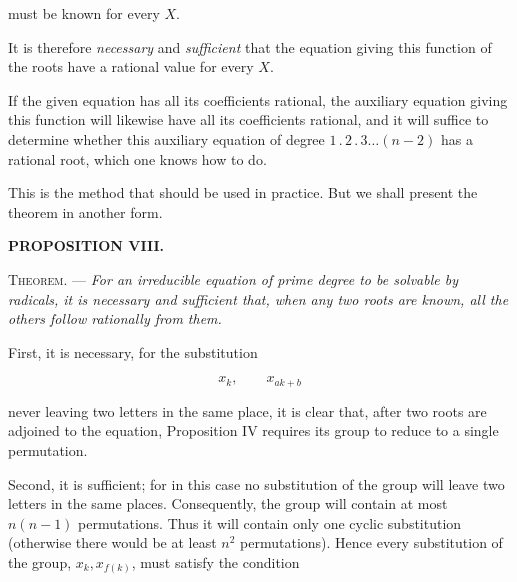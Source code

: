 must be known for every $X$.


It is therefore \emph{necessary} and \emph{sufficient} that the equation giving this
function of the roots have a rational value for every $X$.

If the given equation has all its coefficients rational, the auxiliary equation
giving this function will likewise have all its coefficients rational, and it
will suffice to determine whether this auxiliary equation of degree
$1\mathbin{.}2\mathbin{.}3\ldots(n-2)$ has a rational root, which one knows how
to do.

This is the method that should be used in practice. But we shall present the
theorem in another form.

\begin{center}{\bfseries PROPOSITION VIII.}\end{center}

\noindent\textsc{Theorem.} --- {\itshape For an irreducible equation of prime
degree to be solvable by radicals, it is \emph{necessary} and \emph{sufficient}
that, when any two roots are known, all the others follow rationally from them.}

First, it is necessary, for the substitution

\[
x_{k},\qquad x_{ak+b}
\]

never leaving two letters in the same place, it is clear that, after two roots
are adjoined to the equation, Proposition IV requires its group to reduce to a
single permutation.


Second, it is sufficient; for in this case no substitution of the group will
leave two letters in the same places. Consequently, the group will contain at
most $n(n-1)$ permutations. Thus it will contain only one cyclic substitution
(otherwise there would be at least $n^{2}$ permutations). Hence every
substitution of the group, $x_{k},x_{f(k)}$, must satisfy the condition


